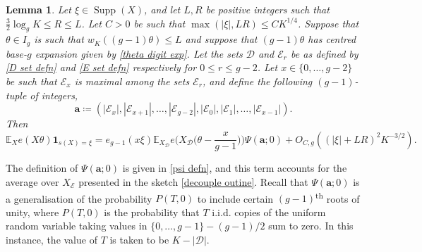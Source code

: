 \documentclass[hidelinks,11pt,reqno]{amsart}
\renewcommand{\leq}{\leqslant}
\newcommand{\E}{\ensuremath{\mathbb{E}}}
\newcommand\Supp{\operatorname{Supp}}
\newcommand{\ind}{\mathbf{1}}
\newcommand{\xb}{X}
\newcommand{\sth}{\textsuperscript{th }}
\newcommand{\xbd}{X_{\mathcal{D}}}
\newcommand{\xbee}{X_{\mathcal{E}}}
\newcommand{\ru}[1]{e_{g-1}(#1)}
\newcommand{\sx}[1]{s(#1)}
\newtheorem{lemma}[prop]{Lemma}
\theoremstyle{remark}
\begin{document}
\begin{lemma}\label{decoupling lemma} Let $\xi \in \Supp(X)$, and let $L,R$ be positive integers such that $\tfrac{3}{2} \log_{g} K\leq R\leq L$. Let $C>0$ be such that $\max(|\xi|,LR)\leq CK^{1/4}$. Suppose that $\theta\in I_{g}$ is such that $w_{K}((g-1)\theta) \leq L$ and suppose that $(g-1)\theta$ has centred base-$g$ expansion given by \cref{theta digit exp}. Let the sets $\mathcal{D}$ and $\mathcal{E}_{r}$ be as defined by \cref{D set defn} and \cref{E set defn} respectively for $0\leq r\leq g-2$. Let $x\in \{0,\ldots, g-2\}$ be such that $\mathcal{E}_{x}$ is maximal among the sets $\mathcal{E}_{r}$, and define the following $(g-1)$-tuple of integers,
\begin{equation}\label{a tuple defn}
    \mathbf{a}\coloneq(|\mathcal{E}_{x}|,|\mathcal{E}_{x+1}|,\ldots, |\mathcal{E}_{g-2}|,|\mathcal{E}_{0}|,|\mathcal{E}_{1}|,\ldots, |\mathcal{E}_{x-1}|).
\end{equation} 
Then
    \[\E_{\xb}e(\xb\theta)\ind_{\sx{\xb}=\xi}=\ru{x\xi}\E_{\xbd}e\Big(\xbd \Big(\theta-\frac{x}{g-1}\Big)\Big)\Psi(\mathbf{a};0)+O_{C,g}((|\xi|+LR)^{2}K^{-3/2}).\]
\end{lemma}
The definition of $\Psi(\mathbf{a};0)$ is given in \cref{psi defn}, and this term accounts for the average over $\xbee$ presented in the sketch \cref{decouple outine}. Recall that $\Psi(\mathbf{a};0)$ is a generalisation of the probability $P(T,0)$ to include certain $(g-1)$\sth roots of unity, where $P(T,0)$ is the probability that $T$ i.i.d. copies of the uniform random variable taking values in $\{0,\ldots, g-1\}-(g-1)/2$ sum to zero. In this instance, the value of $T$ is taken to be $K-|\mathcal{D}|$.
\end{document}
